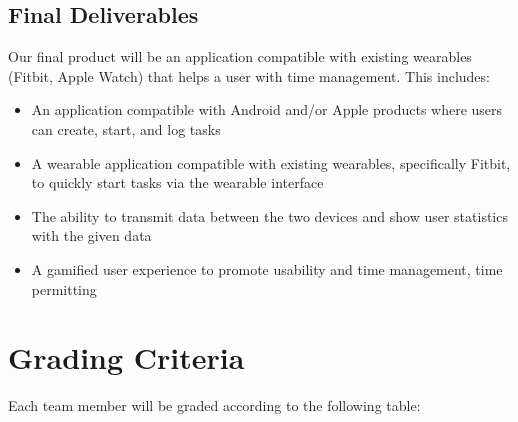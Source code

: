 \documentclass[12pt,letterpaper]{article}
\begin{document}
\begin{itemize}
\end{itemize}


\subsection{Final Deliverables}

Our final product will be an application compatible with existing wearables (Fitbit, Apple Watch) that helps a user with time management. This includes:

\begin{itemize}
  \item An application compatible with Android and/or Apple products where users can create, start, and log tasks
  \item A wearable application compatible with existing wearables, specifically Fitbit, to quickly start tasks via the wearable interface
  \item The ability to transmit data between the two devices and show user statistics with the given data
  \item A gamified user experience to promote usability and time management, time permitting
\end{itemize}



\newpage
\section{Grading Criteria}

\noindent
Each team member will be graded according to the following table:
\end{document}
